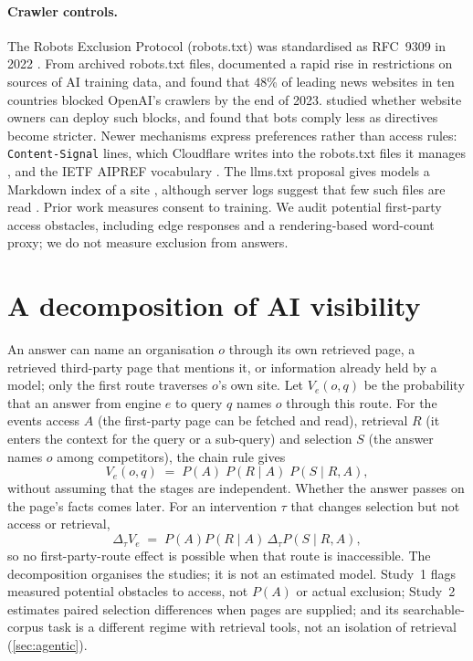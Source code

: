 \documentclass[11pt]{article}
\begin{document}
\paragraph{Crawler controls.}
The Robots Exclusion Protocol (robots.txt) was standardised as RFC~9309 in 2022 \citep{rfc9309}. From archived robots.txt files,
\citet{longpre2024consent} documented a rapid rise in restrictions on sources of AI training data, and
\citet{fletcher2024news} found that 48\% of leading news websites in ten countries blocked OpenAI's crawlers by the
end of 2023. \citet{liu2025somesite} studied whether website owners can deploy such blocks, and
\citet{kim2025scrapers} found that bots comply less as directives become stricter. Newer mechanisms express
preferences rather than access rules: \texttt{Content-Signal} lines, which Cloudflare writes into the robots.txt files
it manages \citep{cloudflare2025signals}, and the IETF AIPREF vocabulary \citep{ietf2026aipref}. The llms.txt proposal
gives models a Markdown index of a site \citep{howard2024llmstxt}, although server logs suggest that few such files are
read \citep{ahrefs2026llmstxt}. Prior work measures consent to training. We audit potential first-party access
obstacles, including edge responses and a rendering-based word-count proxy; we do not measure exclusion from answers.

\section{A decomposition of AI visibility}
\label{sec:framework}

An answer can name an organisation $o$ through its own retrieved page, a retrieved third-party page that mentions it,
or information already held by a model; only the first route traverses $o$'s own site. Let $V_e(o,q)$ be the
probability that an answer from engine $e$ to query $q$ names $o$ through this route. For the events access $A$ (the
first-party page can be fetched and read), retrieval $R$ (it enters the context for the query or a sub-query) and
selection $S$ (the answer names $o$ among competitors), the chain rule gives
\begin{equation}
\label{eq:visibility}
V_e(o,q) \;=\; P(A)\;P(R \mid A)\;P(S \mid R,A),
\end{equation}
without assuming that the stages are independent. Whether the answer passes on the page's facts
\citep{zhang2026absorption} comes later. For an intervention $\tau$ that changes selection but not access or retrieval,
\begin{equation}
\label{eq:scaling}
\Delta_\tau V_e \;=\; P(A)P(R \mid A)\,\Delta_\tau P(S \mid R,A),
\end{equation}
so no first-party-route effect is possible when that route is inaccessible. The decomposition organises the studies; it
is not an estimated model. Study~1 flags measured potential obstacles to access, not $P(A)$ or actual exclusion;
Study~2 estimates paired selection differences when pages are supplied; and its searchable-corpus task is a different
regime with retrieval tools, not an isolation of retrieval (\cref{sec:agentic}).
\end{document}
